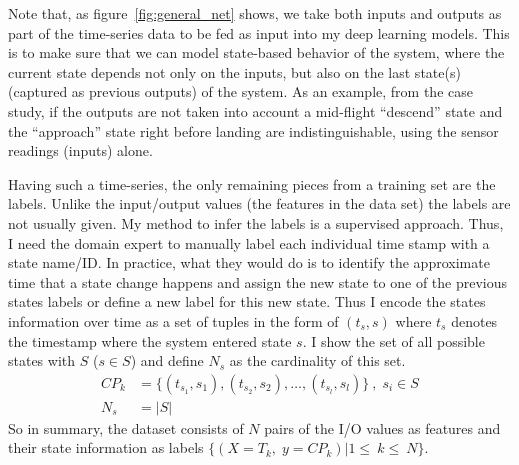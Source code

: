 Note that, as figure~\ref{fig:general_net} shows, we take both inputs and outputs as part of the time-series data to be fed as input into my deep learning models.
This is to make sure that we can model state-based behavior of the system, where the current state depends not only on the inputs, but also on the last state(s) (captured as previous outputs) of the system. As an example, from the case study, if the outputs are not taken into account
a mid-flight ``descend'' state and the ``approach'' state right before landing
are indistinguishable, using the sensor readings (inputs) alone. 

Having such a time-series, the only remaining pieces from a training set are the labels. Unlike the input/output values (the features in the data set) the labels are not usually given. My method to infer the labels is a supervised approach. Thus, I need the domain expert to manually label each individual time stamp with a state name/ID. In practice, what they would do is to identify the approximate time that a state change happens and assign the new state to one of the previous states labels or define a new label for this new state.
Thus I encode the states information over time as a set of tuples in the form of $(t_s, s)$ where $t_s$ denotes the timestamp where the system entered state $s$. I show the set of all possible states with $S$ ($s \in S$) and define $N_s$ as the cardinality of this set.
\begin{equation}\label{eq:change_point}\begin{split}
    CP_k {}&{}= \big\{ (t_{s_1}, s_1), (t_{s_2}, s_2), \ldots, (t_{s_l}, s_l) \big\}\:,\; s_i \in S \\
    N_s  {}&{}= |S|
\end{split}
\end{equation}
So in summary, the dataset consists of $N$ pairs of the I/O values as features and their state information as labels $\big\{(X=T_k,\;y=CP_k)|1\leq~k\leq~N\big\}$. 

